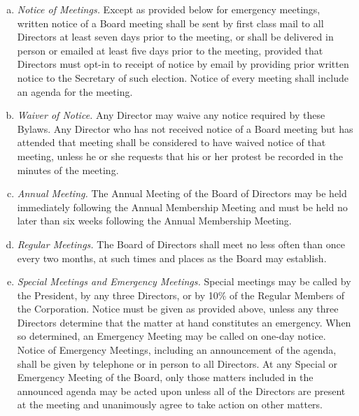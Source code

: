 \begin{enumerate}[a.]
\item \emph{Notice of Meetings.}  Except as provided below for
  emergency meetings, written notice of a Board meeting shall be sent
  by first class mail to all Directors at least seven days prior to
  the meeting, or shall be delivered in person or emailed at least
  five days prior to the meeting, provided that Directors must opt-in
  to receipt of notice by email by providing prior written notice to
  the Secretary of such election. Notice of every meeting shall
  include an agenda for the meeting.
\item \emph{Waiver of Notice.}  Any Director may waive any notice
  required by these Bylaws. Any Director who has not received notice
  of a Board meeting but has attended that meeting shall be considered
  to have waived notice of that meeting, unless he or she requests
  that his or her protest be recorded in the minutes of the meeting.
\item \emph{Annual Meeting.} The Annual Meeting of the Board of
  Directors may be held immediately following the Annual Membership
  Meeting and must be held no later than six weeks following the
  Annual Membership Meeting.
\item \emph{Regular Meetings.}  The Board of Directors shall meet no
  less often than once every two months, at such times and places as
  the Board may establish.
\item \emph{Special Meetings and Emergency Meetings.}  Special
  meetings may be called by the President, by any three Directors, or
  by 10\% of the Regular Members of the Corporation. Notice must be
  given as provided above, unless any three Directors determine that
  the matter at hand constitutes an emergency. When so determined, an
  Emergency Meeting may be called on one-day notice. Notice of
  Emergency Meetings, including an announcement of the agenda, shall
  be given by telephone or in person to all Directors. At any Special
  or Emergency Meeting of the Board, only those matters included in
  the announced agenda may be acted upon unless all of the Directors
  are present at the meeting and unanimously agree to take action on
  other matters.
\end{enumerate}
  
